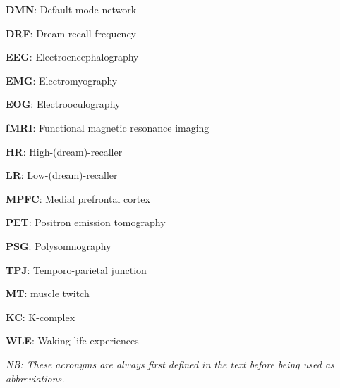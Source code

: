 \label{sec:acronyms}
\vspace*{-10mm}

\begin{multicols}{2}

\textbf{DMN}: Default mode network

\textbf{DRF}: Dream recall frequency

\textbf{EEG}: Electroencephalography

\textbf{EMG}: Electromyography

\textbf{EOG}: Electrooculography

\textbf{fMRI}: Functional magnetic resonance imaging

\textbf{HR}: High-(dream)-recaller

\textbf{LR}: Low-(dream)-recaller

\textbf{MPFC}: Medial prefrontal cortex

\textbf{PET}: Positron emission tomography

\textbf{PSG}: Polysomnography

\textbf{TPJ}: Temporo-parietal junction

\textbf{MT}: muscle twitch

\textbf{KC}: K-complex

\textbf{WLE}: Waking-life experiences
\end{multicols}

\textit{NB: These acronyms are always first defined in the text before being used as abbreviations.}
